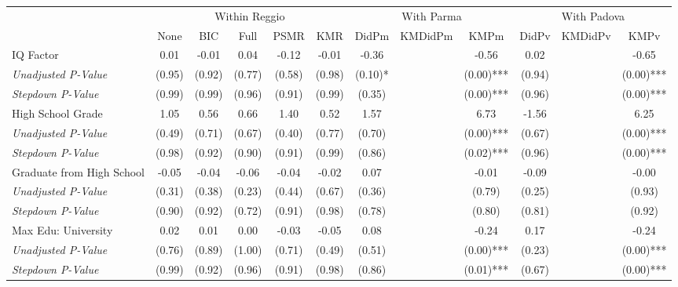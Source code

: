 \begin{tabular}{l c c c c c c c c c c c}
\toprule
& \multicolumn{5}{c}{Within Reggio} & \multicolumn{3}{c}{With Parma} & \multicolumn{3}{c}{With Padova} \\\cmidrule(lr){2-6} \cmidrule(lr){7-9} \cmidrule(lr){10-12}
 & None & BIC & Full & PSMR & KMR & DidPm & KMDidPm & KMPm & DidPv & KMDidPv & KMPv \\
\midrule
IQ Factor & 0.01 & -0.01 & 0.04 & -0.12 & -0.01 & -0.36 & & -0.56 & 0.02 & & -0.65 \\
\quad \textit{Unadjusted P-Value} & (0.95) & (0.92) & (0.77) & (0.58) & (0.98) & (0.10)* & & (0.00)*** & (0.94) & & (0.00)*** \\
\quad \textit{Stepdown P-Value} & (0.99) & (0.99) & (0.96) & (0.91) & (0.99) & (0.35) & & (0.00)*** & (0.96) & & (0.00)*** \\
High School Grade & 1.05 & 0.56 & 0.66 & 1.40 & 0.52 & 1.57 & & 6.73 & -1.56 & & 6.25 \\
\quad \textit{Unadjusted P-Value} & (0.49) & (0.71) & (0.67) & (0.40) & (0.77) & (0.70) & & (0.00)*** & (0.67) & & (0.00)*** \\
\quad \textit{Stepdown P-Value} & (0.98) & (0.92) & (0.90) & (0.91) & (0.99) & (0.86) & & (0.02)*** & (0.96) & & (0.00)*** \\
Graduate from High School & -0.05 & -0.04 & -0.06 & -0.04 & -0.02 & 0.07 & & -0.01 & -0.09 & & -0.00 \\
\quad \textit{Unadjusted P-Value} & (0.31) & (0.38) & (0.23) & (0.44) & (0.67) & (0.36) & & (0.79) & (0.25) & & (0.93) \\
\quad \textit{Stepdown P-Value} & (0.90) & (0.92) & (0.72) & (0.91) & (0.98) & (0.78) & & (0.80) & (0.81) & & (0.92) \\
Max Edu: University & 0.02 & 0.01 & 0.00 & -0.03 & -0.05 & 0.08 & & -0.24 & 0.17 & & -0.24 \\
\quad \textit{Unadjusted P-Value} & (0.76) & (0.89) & (1.00) & (0.71) & (0.49) & (0.51) & & (0.00)*** & (0.23) & & (0.00)*** \\
\quad \textit{Stepdown P-Value} & (0.99) & (0.92) & (0.96) & (0.91) & (0.98) & (0.86) & & (0.01)*** & (0.67) & & (0.00)*** \\
\bottomrule
\end{tabular}
